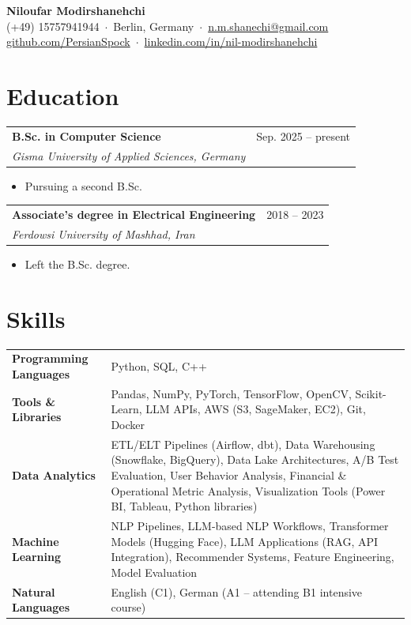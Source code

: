 \documentclass[11pt,a4paper]{article}
\makeatletter
\newcommand{\entry}[4]{%
  \noindent\begin{tabular*}{\textwidth}{@{}l@{\extracolsep{\fill}}r@{}}
    \textbf{#1} & #2 \\
    \textit{#3} & \textit{#4} \\
  \end{tabular*}\vspace{2pt}}
\makeatother
\begin{document}
\begin{center}
  {\LARGE\bfseries Niloufar Modirshanehchi}\\[4pt]
  (+49) 15757941944 \,$\cdot$\, Berlin, Germany \,$\cdot$\,
  \href{mailto:n.m.shanechi@gmail.com}{n.m.shanechi@gmail.com}\\[2pt]
  \href{https://github.com/PersianSpock}{github.com/PersianSpock} \,$\cdot$\,
  \href{https://www.linkedin.com/in/nil-modirshanehchi/}{linkedin.com/in/nil-modirshanehchi}
\end{center}

\section{Education}
\entry{B.Sc. in Computer Science}{Sep. 2025 -- present}
      {Gisma University of Applied Sciences, Germany}{}
\begin{itemize}
  \item Pursuing a second B.Sc.
\end{itemize}
\vspace{4pt}
\entry{Associate's degree in Electrical Engineering}{2018 -- 2023}
      {Ferdowsi University of Mashhad, Iran}{}
\begin{itemize}
  \item Left the B.Sc. degree.
\end{itemize}

\section{Skills}
\begin{tabular}{@{}>{\bfseries}p{3.4cm} p{14cm}@{}}
Programming Languages & Python, SQL, C++ \\[3pt]
Tools \& Libraries & Pandas, NumPy, PyTorch, TensorFlow, OpenCV, Scikit-Learn,
  LLM APIs, AWS (S3, SageMaker, EC2), Git, Docker \\[3pt]
Data Analytics & ETL/ELT Pipelines (Airflow, dbt), Data Warehousing
  (Snowflake, BigQuery), Data Lake Architectures, A/B Test Evaluation,
  User Behavior Analysis, Financial \& Operational Metric Analysis,
  Visualization Tools (Power BI, Tableau, Python libraries) \\[3pt]
Machine Learning & NLP Pipelines, LLM-based NLP Workflows, Transformer Models
  (Hugging Face), LLM Applications (RAG, API Integration), Recommender Systems,
  Feature Engineering, Model Evaluation \\[3pt]
Natural Languages & English (C1), German (A1 -- attending B1 intensive course) \\
\end{tabular}
\end{document}
